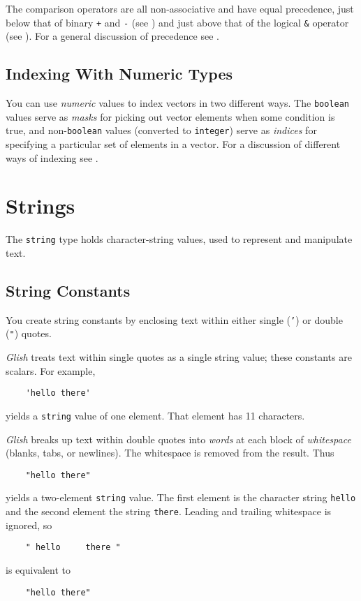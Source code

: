The comparison operators are all non-associative and have equal precedence,
just below that of binary {\tt +} and {\tt -} (see
) and just above that of the logical {\tt \&}
operator (see ).  For a general discussion of
precedence see .


\subsection{Indexing With Numeric Types}

You can use {\em numeric} values to index vectors in two different ways.
The {\tt boolean} values serve as {\em masks} for picking out vector
elements when  some condition is true, and non-{\tt boolean} values
(converted to {\tt integer}) serve as {\em indices} for
specifying a particular set of elements in a vector.
For a discussion of different ways
of indexing see .

\section{Strings}

The {\tt string} type holds character-string values, used to represent
and manipulate text.

\subsection{String Constants}
\label{string-constants}

You create string constants by enclosing text within either single
({\tt '}) or double ({\tt "}) quotes.

{\em Glish} treats text within single quotes as a single
string value; these constants are scalars.
For example,
\begin{verbatim}
    'hello there'
\end{verbatim}
yields a {\tt string} value of one element.  That element has 11 characters.

{\em Glish} breaks up text within double quotes into {\em words} at each block
of {\em whitespace} (blanks, tabs, or newlines).  The whitespace is removed
from the result.  Thus
\begin{verbatim}
    "hello there"
\end{verbatim}
yields a two-element {\tt string} value.  The first element 
is the character string {\tt hello} and the second element the string
{\tt there}.  Leading and trailing whitespace is ignored, so
\begin{verbatim}
    " hello     there "
\end{verbatim}
is equivalent to
\begin{verbatim}
    "hello there"
\end{verbatim}


